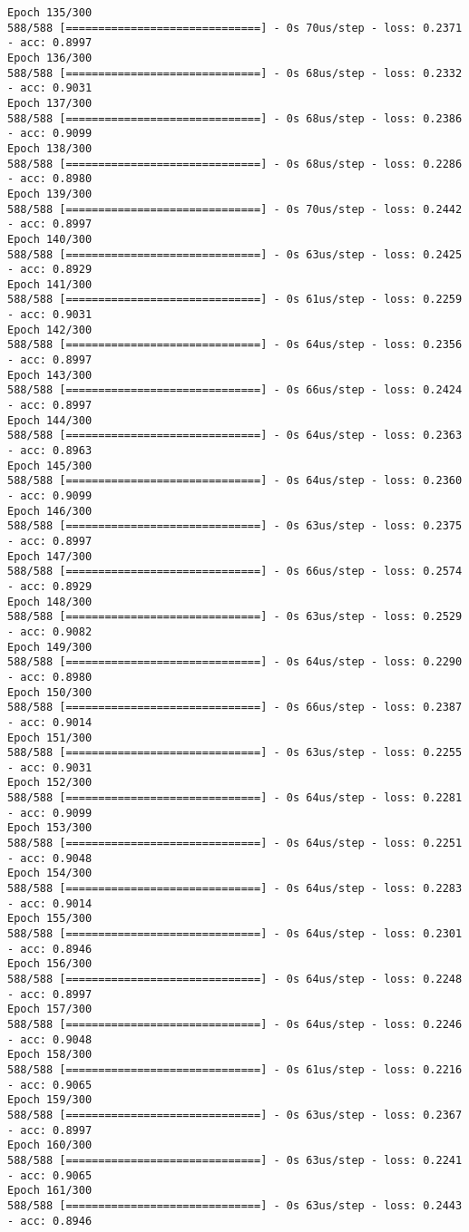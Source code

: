 \documentclass[11pt]{article}
\begin{document}
\begin{Verbatim}[commandchars=\\\{\}]
Epoch 135/300
588/588 [==============================] - 0s 70us/step - loss: 0.2371 - acc: 0.8997
Epoch 136/300
588/588 [==============================] - 0s 68us/step - loss: 0.2332 - acc: 0.9031
Epoch 137/300
588/588 [==============================] - 0s 68us/step - loss: 0.2386 - acc: 0.9099
Epoch 138/300
588/588 [==============================] - 0s 68us/step - loss: 0.2286 - acc: 0.8980
Epoch 139/300
588/588 [==============================] - 0s 70us/step - loss: 0.2442 - acc: 0.8997
Epoch 140/300
588/588 [==============================] - 0s 63us/step - loss: 0.2425 - acc: 0.8929
Epoch 141/300
588/588 [==============================] - 0s 61us/step - loss: 0.2259 - acc: 0.9031
Epoch 142/300
588/588 [==============================] - 0s 64us/step - loss: 0.2356 - acc: 0.8997
Epoch 143/300
588/588 [==============================] - 0s 66us/step - loss: 0.2424 - acc: 0.8997
Epoch 144/300
588/588 [==============================] - 0s 64us/step - loss: 0.2363 - acc: 0.8963
Epoch 145/300
588/588 [==============================] - 0s 64us/step - loss: 0.2360 - acc: 0.9099
Epoch 146/300
588/588 [==============================] - 0s 63us/step - loss: 0.2375 - acc: 0.8997
Epoch 147/300
588/588 [==============================] - 0s 66us/step - loss: 0.2574 - acc: 0.8929
Epoch 148/300
588/588 [==============================] - 0s 63us/step - loss: 0.2529 - acc: 0.9082
Epoch 149/300
588/588 [==============================] - 0s 64us/step - loss: 0.2290 - acc: 0.8980
Epoch 150/300
588/588 [==============================] - 0s 66us/step - loss: 0.2387 - acc: 0.9014
Epoch 151/300
588/588 [==============================] - 0s 63us/step - loss: 0.2255 - acc: 0.9031
Epoch 152/300
588/588 [==============================] - 0s 64us/step - loss: 0.2281 - acc: 0.9099
Epoch 153/300
588/588 [==============================] - 0s 64us/step - loss: 0.2251 - acc: 0.9048
Epoch 154/300
588/588 [==============================] - 0s 64us/step - loss: 0.2283 - acc: 0.9014
Epoch 155/300
588/588 [==============================] - 0s 64us/step - loss: 0.2301 - acc: 0.8946
Epoch 156/300
588/588 [==============================] - 0s 64us/step - loss: 0.2248 - acc: 0.8997
Epoch 157/300
588/588 [==============================] - 0s 64us/step - loss: 0.2246 - acc: 0.9048
Epoch 158/300
588/588 [==============================] - 0s 61us/step - loss: 0.2216 - acc: 0.9065
Epoch 159/300
588/588 [==============================] - 0s 63us/step - loss: 0.2367 - acc: 0.8997
Epoch 160/300
588/588 [==============================] - 0s 63us/step - loss: 0.2241 - acc: 0.9065
Epoch 161/300
588/588 [==============================] - 0s 63us/step - loss: 0.2443 - acc: 0.8946

\end{Verbatim}
\end{document}
